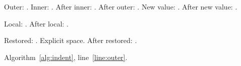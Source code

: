 \documentclass{article}
\makeatletter
\newlength{\stepwidth}
\newcommand{\stepvalue}{\stepwidth}
\newcommand{\IndentValue}{\the\ALG@tlm}
\makeatother
\begin{document}
\begin{algorithm}
\caption{Renewable indentation}\label{alg:indent}
\begin{algorithmic}[1]
  \State Outer: \IndentValue.\label{line:outer}
  \algrenewcommand\algorithmicindent{\stepvalue}
    \State Inner: \IndentValue.
    \setlength{\stepwidth}{7pt}
  \EndFor
  \State After inner: \IndentValue.
\EndProcedure
\State After outer: \IndentValue.
  \State New value: \IndentValue.
\EndIf
\State After new value: \IndentValue.
\end{algorithmic}
\end{algorithm}
\begingroup
\algrenewcommand\algorithmicindent{3pt}
\begin{algorithmic}[1]
  \State Local: \IndentValue.
\EndIf
\State After local: \IndentValue.
\end{algorithmic}
\endgroup
\begin{algorithmic}[1]
  \State Restored: \IndentValue.
  \State \hspace{\algorithmicindent}Explicit space.
\EndIf
\State After restored: \IndentValue.
\end{algorithmic}
Algorithm~\ref{alg:indent}, line~\ref{line:outer}.
\end{document}

